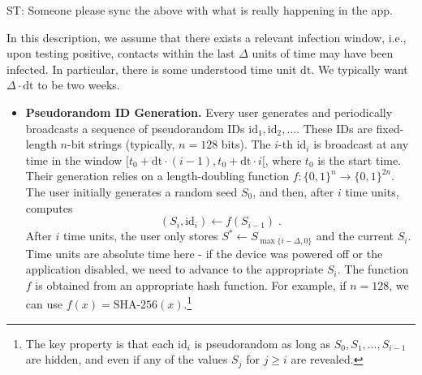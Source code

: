 \documentclass{article}
\newcommand{\TODO}[1]{ {\color{blue} #1 }}
\begin{document}
\TODO{ST: Someone please sync the above with what is really happening in the app.}

\newcommand{\id}{\mathrm{id}}
\newcommand{\dt}{\mathrm{dt}}
 In this description, we assume that there exists a relevant infection window, i.e., upon testing positive, contacts within the last $\Delta$ units of time may have been infected. In particular, there is some understood time unit $\dt$. We typically want $\Delta \cdot \dt$ to be two weeks. 


\begin{itemize}
    \item {\bf Pseudorandom ID Generation.} Every user generates and periodically broadcasts a sequence of pseudorandom IDs $\id_1, \id_2, \ldots$. These IDs are fixed-length $n$-bit strings (typically, $n = 128$ bits). The $i$-th $\id_i$ is broadcast at any time in the window $[t_0 + \dt\cdot (i-1), t_0 + \dt\cdot i[$, where $t_0$ is the start time. Their generation relies on a length-doubling function $f: \{0,1\}^n \to \{0,1\}^{2n}$. The user initially generates a random seed $S_0$, and then, after $i$ time units, computes
\begin{displaymath}
(S_i, \id_i) \gets f(S_{i-1}) \;.
\end{displaymath}
After $i$ time units, the user only stores $S^* \gets S_{\max\{i-\Delta,0\}}$ and the current $S_i$. Time units are absolute time here - if the device was powered off or the application disabled, we need to advance to the appropriate $S_i$. The function $f$ is obtained from an appropriate hash function. For example, if $n = 128$, we can use $f(x) = \textrm{SHA-256}(x)$.\footnote{The key property is that each $\id_i$ is pseudorandom  as long as $S_0, S_1, \ldots, S_{i-1}$ are hidden, and even if any of the values $S_j$ for $j \geq i$ are revealed.}


\end{itemize}
\end{document}
